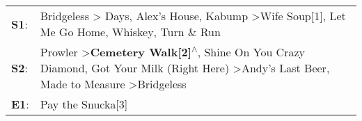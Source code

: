 \begin{supertabular}{p{0.03\textwidth}p{0.92\textwidth}}
 \textbf{S1}:  &                                                                  Bridgeless\textsuperscript{} \textgreater {} Days\textsuperscript{}, \enspace Alex's House\textsuperscript{}, \enspace Kabump\textsuperscript{} \textgreater \enspace Wife Soup[1]\textsuperscript{}, \enspace Let Me Go Home, Whiskey\textsuperscript{}, \enspace Turn \& Run\textsuperscript{}  \enspace  \\
 \textbf{S2}:  &  Prowler\textsuperscript{} \textgreater \enspace \textbf{Cemetery Walk[2]\textsuperscript{$\wedge$}}, \enspace Shine On You Crazy Diamond\textsuperscript{}, \enspace Got Your Milk (Right Here)\textsuperscript{} \textgreater \enspace Andy's Last Beer\textsuperscript{}, \enspace Made to Measure\textsuperscript{} \textgreater \enspace Bridgeless\textsuperscript{}  \enspace  \\
 \textbf{E1}:  &                                                                                                                                                                                                                                                                                                                                        Pay the Snucka[3]\textsuperscript{}  \enspace  \\
\end{supertabular}
